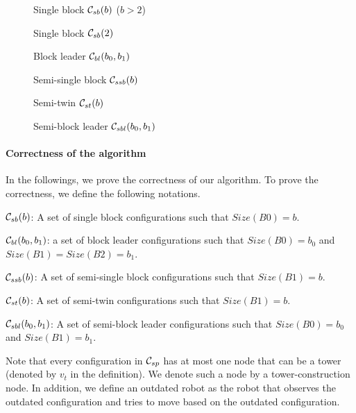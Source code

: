 \documentclass[11pt]{article}
\newcommand{\CONF}{{\cal C}}
\begin{document}
\begin{figure}[t!]
 \begin{minipage}[b]{.3\linewidth}
  \centering{}
  \caption{Single block $\CONF_{sb}(b)$ ($b>2$)\label{SB}}
 \end{minipage} \hfill
 \begin{minipage}[b]{.3\linewidth}
  \centering{}
  \caption{Single block $\CONF_{sb}(2)$\label{SB2}}
 \end{minipage} \hfill
 \begin{minipage}[b]{.3\linewidth}
  \centering{}
  \caption{Block leader $\CONF_{bl}(b_0,b_1)$\label{BL}}
 \end{minipage} \hfill
 \begin{minipage}[b]{.3\linewidth}
  \centering{}
  \caption{Semi-single block $\CONF_{ssb}(b)$\label{SSB}}
 \end{minipage} \hfill
 \begin{minipage}[b]{.3\linewidth}
  \centering{}
  \caption{Semi-twin $\CONF_{st}(b)$\label{ST}}
 \end{minipage} \hfill
 \begin{minipage}[b]{.3\linewidth}
  \centering{}
  \caption{Semi-block leader $\CONF_{sbl}(b_0,b_1)$\label{SBL}}
 \end{minipage} \hfill
\end{figure}  


\paragraph{Correctness of the algorithm}
In the followings, we prove the correctness of our algorithm. To prove the correctness, we define the following notations.
\begin{itemize*}
\item $\CONF_{sb}(b)$: A set of single block configurations such that $Size(B0)=b$.
\item $\CONF_{bl}(b_0,b_1)$: a set of block leader configurations such that $Size(B0)=b_0$ and $Size(B1)=Size(B2)=b_1$.
\item $\CONF_{ssb}(b)$: A set of semi-single block configurations such that $Size(B1)=b$.
\item $\CONF_{st}(b)$: A set of semi-twin configurations such that $Size(B1)=b$.
\item $\CONF_{sbl}(b_0,b_1)$: A set of semi-block leader configurations such that $Size(B0)=b_0$ and $Size(B1)=b_1$.
\end{itemize*}
Note that every configuration in $\CONF_{sp}$ has at most one node that can be a tower (denoted by $v_t$ in the definition). We denote such a node by a tower-construction node. In addition, we define an outdated robot as the robot that observes the outdated configuration and tries to move based on the outdated configuration. 
\end{document}
